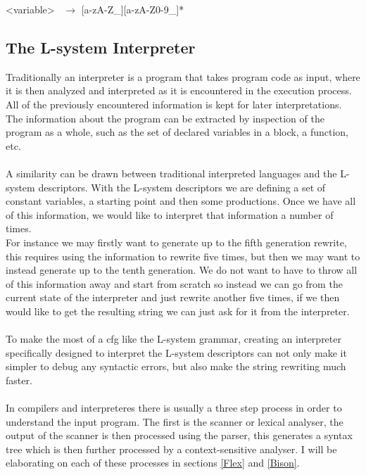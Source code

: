 \noindent
\textless variable\textgreater~ $\rightarrow$ [a-zA-Z\_][a-zA-Z0-9\_]* \\




\newpage
\subsection{The L-system Interpreter}

Traditionally an interpreter is a program that takes program code as input, where it is then analyzed and interpreted as it is encountered in the execution process. All of the previously encountered information is kept for later interpretations. The information about the program can be extracted by inspection of the program as a whole, such as the set of declared variables in a block, a function, etc. \cite{wilhelm2010compiler} \\
\\
A similarity can be drawn between traditional interpreted languages and the L-system descriptors. With the L-system descriptors we are defining a set of constant variables, a starting point and then some productions. Once we have all of this information, we would like to interpret that information a number of times. \\
For instance we may firstly want to generate up to the fifth generation rewrite, this requires using the information to rewrite five times, but then we may want to instead generate up to the tenth generation. We do not want to have to throw all of this information away and start from scratch so instead we can go from the current state of the interpreter and just rewrite another five times, if we then would like to get the resulting string we can just ask for it from the interpreter. \\
\\
To make the most of a \acrshort{cfg} like the L-system grammar, creating an interpreter specifically designed to interpret the L-system descriptors can not only make it simpler to debug any syntactic errors, but also make the string rewriting much faster.\\
\\
In compilers and interpreteres there is usually a three step process in order to understand the input program. The first is the scanner or lexical analyser, the output of the scanner is then processed using the parser, this generates a syntax tree which is then further processed by a context-sensitive analyser. I will be elaborating on each of these processes in sections \ref{Flex} and \ref{Bison}. \\


